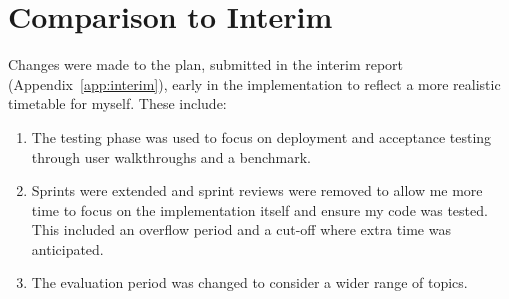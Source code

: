 
\section{Comparison to Interim}

Changes were made to the plan, submitted in the interim report (Appendix~\ref{app:interim}), early in the implementation to reflect a more realistic timetable for myself. These include:

\begin{enumerate}
  \item The testing phase was used to focus on deployment and acceptance testing through user walkthroughs and a benchmark.
  \item Sprints were extended and sprint reviews were removed to allow me more time to focus on the implementation itself and ensure my code was tested. This included an overflow period and a cut-off where extra time was anticipated.
  \item The evaluation period was changed to consider a wider range of topics.
\end{enumerate}